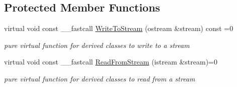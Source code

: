 \subsection*{Protected Member Functions}
\begin{DoxyCompactItemize}
\item 
\hypertarget{class_t_r_t_base_a5db5960db25eecaf9df5b09463da59eb}{virtual void const \+\_\+\+\_\+fastcall \hyperlink{class_t_r_t_base_a5db5960db25eecaf9df5b09463da59eb}{Write\+To\+Stream} (ostream \&stream) const =0}\label{class_t_r_t_base_a5db5960db25eecaf9df5b09463da59eb}

\begin{DoxyCompactList}\small\item\em pure virtual function for derived classes to write to a stream \end{DoxyCompactList}\item 
\hypertarget{class_t_r_t_base_af68d8bc77ec5893fea6ca486cdd136fc}{virtual void const \+\_\+\+\_\+fastcall \hyperlink{class_t_r_t_base_af68d8bc77ec5893fea6ca486cdd136fc}{Read\+From\+Stream} (istream \&stream)=0}\label{class_t_r_t_base_af68d8bc77ec5893fea6ca486cdd136fc}

\begin{DoxyCompactList}\small\item\em pure virtual function for derived classes to read from a stream \end{DoxyCompactList}\end{DoxyCompactItemize}
